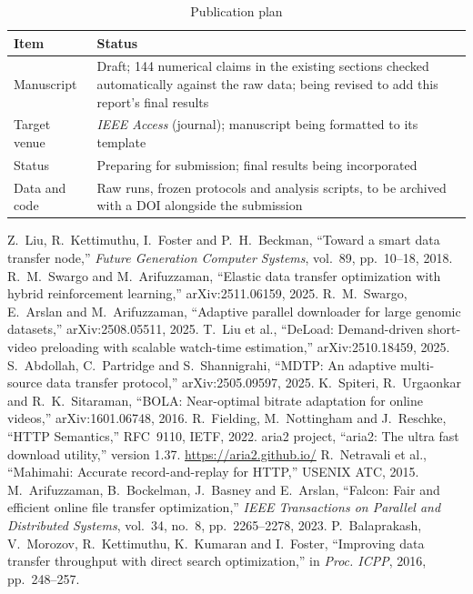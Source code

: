 \begin{table}[H]\centering
\caption{Publication plan}\label{tab:outcome}
\begin{tabularx}{\linewidth}{@{}lL@{}}
\toprule
\textbf{Item} & \textbf{Status}\\
\midrule
Manuscript & Draft; 144 numerical claims in the existing sections checked automatically against the raw data; being revised to add this report's final results\\
Target venue & \emph{IEEE Access} (journal); manuscript being formatted to its template\\
Status & Preparing for submission; final results being incorporated\\
Data and code & Raw runs, frozen protocols and analysis scripts, to be archived with a DOI alongside the submission\\
\bottomrule
\end{tabularx}
\end{table}

\begin{thebibliography}{9}
 Z.~Liu, R.~Kettimuthu, I.~Foster and P.~H.~Beckman, ``Toward a smart data transfer node,'' \emph{Future Generation Computer Systems}, vol.~89, pp.~10--18, 2018.
 R.~M.~Swargo and M.~Arifuzzaman, ``Elastic data transfer optimization with hybrid reinforcement learning,'' arXiv:2511.06159, 2025.
 R.~M.~Swargo, E.~Arslan and M.~Arifuzzaman, ``Adaptive parallel downloader for large genomic datasets,'' arXiv:2508.05511, 2025.
 T.~Liu et al., ``DeLoad: Demand-driven short-video preloading with scalable watch-time estimation,'' arXiv:2510.18459, 2025.
 S.~Abdollah, C.~Partridge and S.~Shannigrahi, ``MDTP: An adaptive multi-source data transfer protocol,'' arXiv:2505.09597, 2025.
 K.~Spiteri, R.~Urgaonkar and R.~K.~Sitaraman, ``BOLA: Near-optimal bitrate adaptation for online videos,'' arXiv:1601.06748, 2016.
 R.~Fielding, M.~Nottingham and J.~Reschke, ``HTTP Semantics,'' RFC~9110, IETF, 2022.
 aria2 project, ``aria2: The ultra fast download utility,'' version 1.37. \url{https://aria2.github.io/}
 R.~Netravali et al., ``Mahimahi: Accurate record-and-replay for HTTP,'' USENIX ATC, 2015.
 M.~Arifuzzaman, B.~Bockelman, J.~Basney and E.~Arslan, ``Falcon: Fair and efficient online file transfer optimization,'' \emph{IEEE Transactions on Parallel and Distributed Systems}, vol.~34, no.~8, pp.~2265--2278, 2023.
 P.~Balaprakash, V.~Morozov, R.~Kettimuthu, K.~Kumaran and I.~Foster, ``Improving data transfer throughput with direct search optimization,'' in \emph{Proc. ICPP}, 2016, pp.~248--257.
\end{thebibliography}


